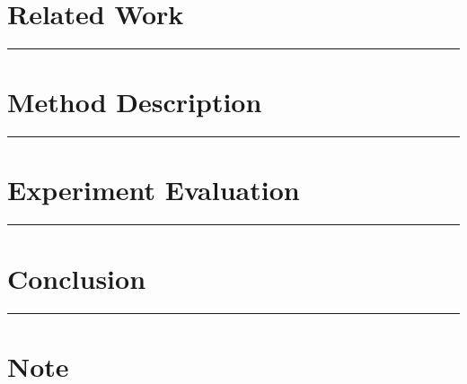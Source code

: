 \documentclass[letterpaper,10pt]{article}
\begin{document}
\section{Related Work}


\begin{center}\rule{\textwidth}{1pt}\end{center}
\section{Method Description}


\begin{center}\rule{\textwidth}{1pt}\end{center}
\section{Experiment Evaluation}


\begin{center}\rule{\textwidth}{1pt}\end{center}
\section{Conclusion}


\begin{center}\rule{\textwidth}{1pt}\end{center}
\section{Note}
\end{document}
